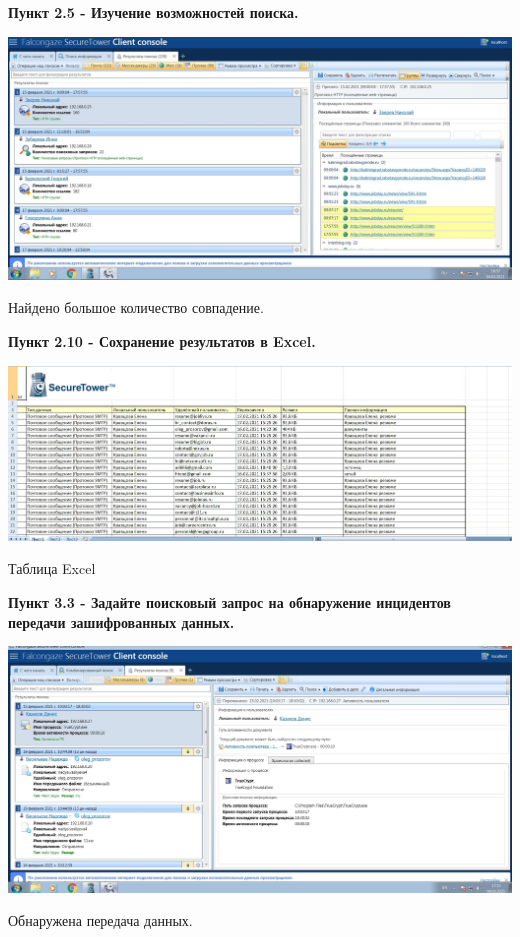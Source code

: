 \documentclass[a4paper,14pt]{extarticle}
\begin{document}
    \textbf{Пункт 2.5 - Изучение возможностей поиска.}
    \begin{center}
        \includegraphics[scale=0.25]{pics/2.5.jpg}

        Найдено большое количество совпадение.
    \end{center}

    \newpage
    \textbf{Пункт 2.10 - Сохранение результатов в Excel.}
    \begin{center}
        \includegraphics[scale=0.25]{pics/2.10.jpg}

        Таблица Excel
    \end{center}

    \textbf{Пункт 3.3 - Задайте поисковый запрос на обнаружение инцидентов передачи
    зашифрованных данных.}
    \begin{center}
        \includegraphics[scale=0.25]{pics/3.3.jpg}

        Обнаружена передача данных. 
    \end{center}
\end{document}
